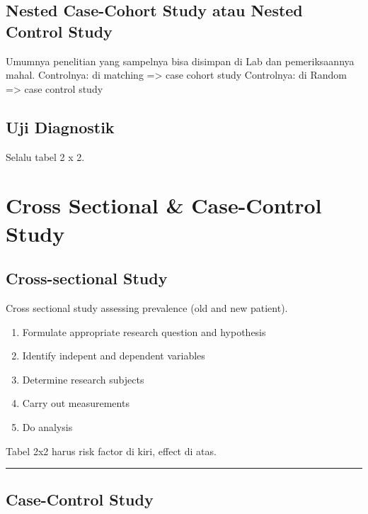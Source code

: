 \documentclass[
  letterpaper,
  DIV=11,
  numbers=noendperiod]{scrreprt}
\providecommand{\tightlist}{%
  \setlength{\itemsep}{0pt}\setlength{\parskip}{0pt}}\usepackage{longtable,booktabs,array}
\begin{document}
\subsection{Nested Case-Cohort Study atau Nested Control
Study}\label{nested-case-cohort-study-atau-nested-control-study}

Umumnya penelitian yang sampelnya bisa disimpan di Lab dan
pemeriksaannya mahal. Controlnya: di matching =\textgreater{} case
cohort study Controlnya: di Random =\textgreater{} case control study

\subsection{Uji Diagnostik}\label{uji-diagnostik}

Selalu tabel 2 x 2.

\section{Cross Sectional \& Case-Control
Study}\label{cross-sectional-case-control-study}

\subsection{Cross-sectional Study}\label{cross-sectional-study}

Cross sectional study assessing prevalence (old and new patient).

\begin{enumerate}
\def\labelenumi{\arabic{enumi}.}
\tightlist
\item
  Formulate appropriate research question and hypothesis
\item
  Identify indepent and dependent variables
\item
  Determine research subjects
\item
  Carry out measurements
\item
  Do analysis
\end{enumerate}

Tabel 2x2 harus risk factor di kiri, effect di atas.

\begin{center}\rule{0.5\linewidth}{0.5pt}\end{center}

\subsection{Case-Control Study}\label{case-control-study}
\end{document}
